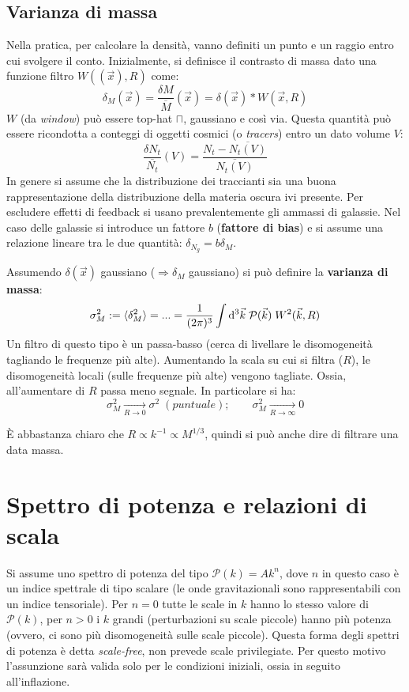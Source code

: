 \subsection{Varianza di massa}
Nella pratica, per calcolare la densità, vanno definiti un punto e un raggio entro cui svolgere il conto. Inizialmente, si definisce il contrasto di massa dato una funzione filtro $W((\vec{x}),R)$ come:
$$
\delta_M(\vec{x}) = \frac{\delta M}{\overline{M}}(\vec{x}) = \delta (\vec{x}) * W(\vec{x}, R)
$$
$W$ (da \textit{window}) può essere top-hat $\sqcap $, gaussiano e così via. Questa quantità può essere ricondotta a conteggi di oggetti cosmici (o \textit{tracers}) entro un dato volume $V$:
$$
\frac{\delta N_t}{\overline{N_t}}(V) = \frac{N_t-\overline{N_t(V)}}{\overline{N_t(V)}}
$$
In genere si assume che la distribuzione dei traccianti sia una buona rappresentazione della distribuzione della materia oscura ivi presente. Per escludere effetti di feedback si usano prevalentemente gli ammassi di galassie. Nel caso delle galassie si introduce un fattore $b$ (\textbf{fattore di bias}) e si assume una relazione lineare tra le due quantità: $\delta_{N_g} = b \delta_M$.

Assumendo $\delta (\vec{x})$ gaussiano ($\Rightarrow \delta_M$ gaussiano) si può definire la \textbf{varianza di massa}:
\begin{equation}
    \sigma_M^2 :=  \langle  \delta_M ^2 \rangle = ... = \frac{1}{(2\pi)^3}\int \operatorname{d}\!{^3\vec{k}}\; \mathcal{P}(\vec{k}) \; W^2(\vec{k}, R)
\end{equation}
Un filtro di questo tipo è un passa-basso (cerca di livellare le disomogeneità tagliando le frequenze più alte). Aumentando la scala su cui si filtra ($R$), le disomogeneità locali (sulle frequenze più alte) vengono tagliate. Ossia, all'aumentare di $R$ passa meno segnale. In particolare si ha:
\begin{equation}
    \sigma_M^2 \xrightarrow[R\to 0]{} \sigma^2 \; (puntuale); \qquad \sigma_M^2 \xrightarrow[R\to \infty]{} 0 \label{eq8:sigmamvsr}
\end{equation}

È abbastanza chiaro che $R\propto k^{-1}\propto M^{1/3}$, quindi si può anche dire di filtrare una data massa.

\section{Spettro di potenza e relazioni di scala}
Si assume uno spettro di potenza del tipo $\mathcal{P}(k) = A k^{n}$, dove $n$ in questo caso è un indice spettrale di tipo scalare (le onde gravitazionali sono rappresentabili con un indice tensoriale). Per $n=0$ tutte le scale in $k$ hanno lo stesso valore di $\mathcal{P}(k)$, per $n>0$ i $k$ grandi (perturbazioni su scale piccole) hanno più potenza (ovvero, ci sono più disomogeneità sulle scale piccole). Questa forma degli spettri di potenza è detta \textit{scale-free}, non prevede scale privilegiate. Per questo motivo l'assunzione sarà valida solo per le condizioni iniziali, ossia in seguito all'inflazione.

